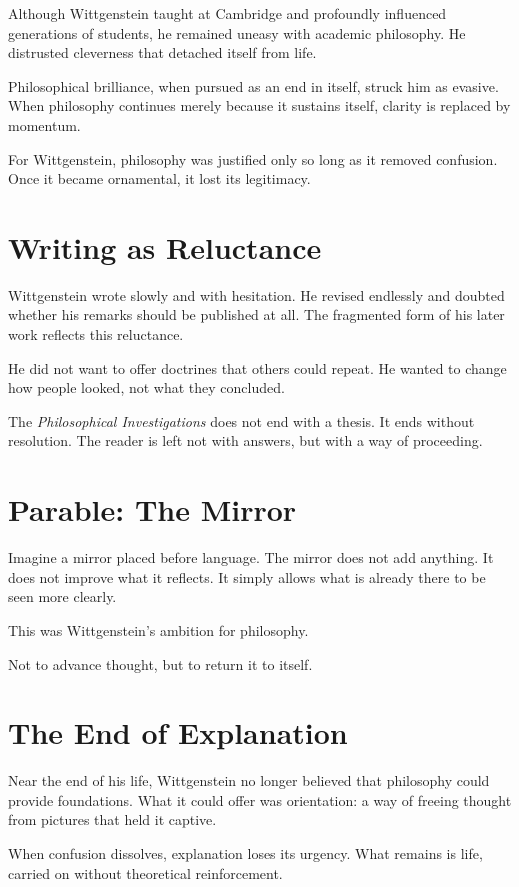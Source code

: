 \documentclass[11pt]{article}
\begin{document}
Although Wittgenstein taught at Cambridge and profoundly influenced generations of students, he remained uneasy with academic philosophy. He distrusted cleverness that detached itself from life.

Philosophical brilliance, when pursued as an end in itself, struck him as evasive. When philosophy continues merely because it sustains itself, clarity is replaced by momentum.

For Wittgenstein, philosophy was justified only so long as it removed confusion. Once it became ornamental, it lost its legitimacy.

\section*{Writing as Reluctance}

Wittgenstein wrote slowly and with hesitation. He revised endlessly and doubted whether his remarks should be published at all. The fragmented form of his later work reflects this reluctance.

He did not want to offer doctrines that others could repeat. He wanted to change how people looked, not what they concluded.

The \emph{Philosophical Investigations} does not end with a thesis. It ends without resolution. The reader is left not with answers, but with a way of proceeding.

\section*{Parable: The Mirror}

Imagine a mirror placed before language. The mirror does not add anything. It does not improve what it reflects. It simply allows what is already there to be seen more clearly.

This was Wittgenstein’s ambition for philosophy.

Not to advance thought, but to return it to itself.

\section*{The End of Explanation}

Near the end of his life, Wittgenstein no longer believed that philosophy could provide foundations. What it could offer was orientation: a way of freeing thought from pictures that held it captive.

When confusion dissolves, explanation loses its urgency. What remains is life, carried on without theoretical reinforcement.
\end{document}
